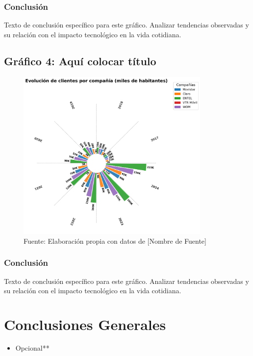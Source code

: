 \documentclass[12pt, a4paper]{article}
\begin{document}
\subsubsection*{Conclusión}
Texto de conclusión específico para este gráfico. Analizar tendencias observadas y su relación con el impacto tecnológico en la vida cotidiana.

\subsection*{Gráfico 4: Aquí colocar título}
\begin{figure}[H]
    \centering
    \includegraphics[width=0.85\textwidth]{images/graph2_JG.png}
    \caption{Fuente: Elaboración propia con datos de [Nombre de Fuente]}
\end{figure}

\subsubsection*{Conclusión}
Texto de conclusión específico para este gráfico. Analizar tendencias observadas y su relación con el impacto tecnológico en la vida cotidiana.


\section*{Conclusiones Generales}
\begin{itemize}
    \item Opcional**
  
\end{itemize}
\end{document}
